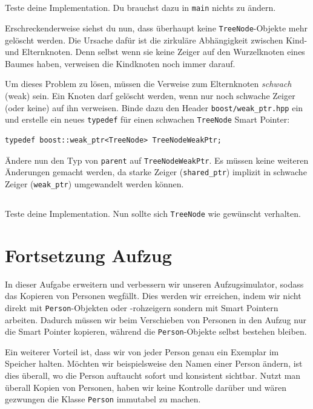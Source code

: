\subsection{}
Teste deine Implementation.
Du brauchst dazu in \texttt{main} nichts zu ändern.

Erschreckenderweise siehst du nun, dass überhaupt keine \texttt{TreeNode}-Objekte mehr gelöscht werden.
Die Ursache dafür ist die zirkuläre Abhängigkeit zwischen Kind- und Elternknoten.
Denn selbst wenn sie keine Zeiger auf den Wurzelknoten eines Baumes haben, verweisen die Kindknoten noch immer darauf.

Um dieses Problem zu lösen, müssen die Verweise zum Elternknoten \emph{schwach} (weak) sein.
Ein Knoten darf gelöscht werden, wenn nur noch schwache Zeiger (oder keine) auf ihn verweisen.
Binde dazu den Header \texttt{boost/weak\_ptr.hpp} ein und erstelle ein neues \texttt{typedef} für einen schwachen \texttt{TreeNode} Smart Pointer:

\begin{lstlisting}
typedef boost::weak_ptr<TreeNode> TreeNodeWeakPtr;
\end{lstlisting}

Ändere nun den Typ von \texttt{parent} auf \texttt{TreeNodeWeakPtr}.
Es müssen keine weiteren Änderungen gemacht werden, da starke Zeiger (\texttt{shared\_ptr}) implizit in schwache Zeiger (\texttt{weak\_ptr}) umgewandelt werden können.

\subsection{}
Teste deine Implementation.
Nun sollte sich \texttt{TreeNode} wie gewünscht verhalten.



\newpage

\section{Fortsetzung Aufzug}
In dieser Aufgabe erweitern und verbessern wir unseren Aufzugsimulator, sodass das Kopieren von Personen wegfällt.
Dies werden wir erreichen, indem wir nicht direkt mit \texttt{Person}-Objekten oder -rohzeigern sondern mit Smart Pointern arbeiten.
Dadurch müssen wir beim Verschieben von Personen in den Aufzug nur die Smart Pointer kopieren, während die \texttt{Person}-Objekte selbst bestehen bleiben.

Ein weiterer Vorteil ist, dass wir von jeder Person genau ein Exemplar im Speicher halten.
Möchten wir beispielsweise den Namen einer Person ändern, ist dies überall, wo die Person auftaucht sofort und konsistent sichtbar.
Nutzt man überall Kopien von Personen, haben wir keine Kontrolle darüber und wären gezwungen die Klasse \texttt{Person} immutabel zu machen.

